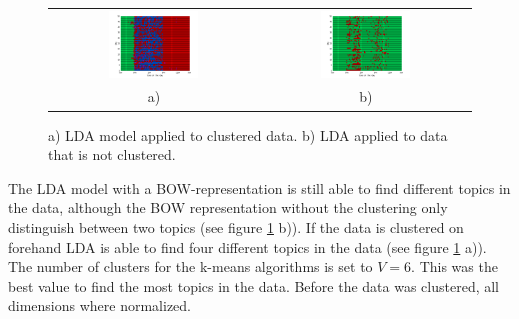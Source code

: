\begin{figure}
 \centering
 \begin{tabular}{c c}
  \centering
  \includegraphics[width=0.45\textwidth]{Pictures/DayTopicsTs96k5Clus.png}
  &
  \includegraphics[width=0.45\textwidth]{Pictures/DayTopicsTs96k5bow.png}\\
  a) & b)
 \end{tabular}
 \caption{a) LDA model applied to clustered data. b) LDA applied to data that is not clustered.}
 \label{fig:BOWtopics}
\end{figure}

\pagebreak
 
The LDA model with a BOW-representation is still able to find different topics in the data, although the BOW representation without the clustering only distinguish between two topics (see figure \ref{fig:BOWtopics} b)). If the data is clustered on forehand LDA is able to find four different topics in the data (see figure \ref{fig:BOWtopics} a)). The number of clusters for the k-means algorithms is set to $V=6$. This was the best value to find the most topics in the data. Before the data was clustered, all dimensions where normalized.\\

